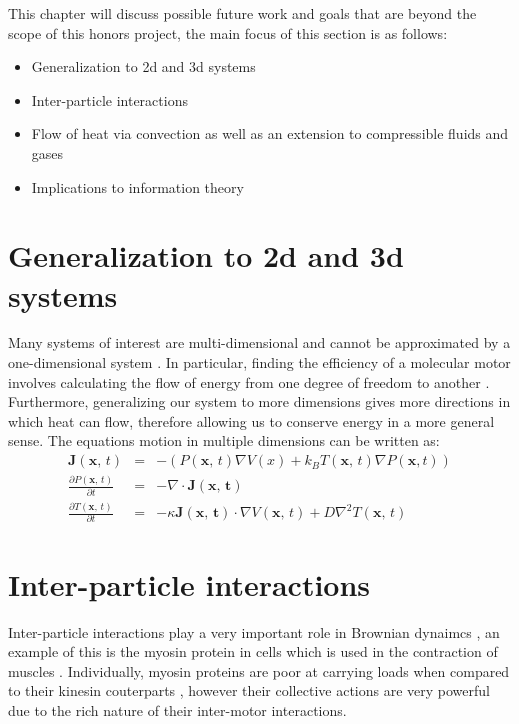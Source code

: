 This chapter will discuss possible future work and goals that are beyond the scope of this honors project, the main focus of this section is as follows:

\begin{itemize}
    \item{Generalization to 2d and 3d systems}
    \item{Inter-particle interactions}
    \item{Flow of heat via convection as well as an extension to compressible fluids and gases}
    \item{Implications to information theory}
\end{itemize}

\section{Generalization to 2d and 3d systems}
Many systems of interest are multi-dimensional and cannot be approximated by a one-dimensional system \cite{KellerBustamante2000,Magnasco1994,Reimann2001,ChallisJack2014,M.W.Jack2016}. In particular, finding the efficiency of a molecular motor involves calculating the flow of energy from one degree of freedom to another \cite{M.W.Jack2016}. Furthermore, generalizing our system to more dimensions gives more directions in which heat can flow, therefore allowing us to conserve energy in a more general sense. The equations motion in multiple dimensions can be written as:
\begin{eqnarray}
\mathbf{J}(\mathbf{x}, \, t) &=& - (P(\mathbf{x}, \, t) \nabla V(x) + k_B T(\mathbf{x}, \, t) \nabla P(\mathbf{x}, t)) \\
\frac{\partial P(\mathbf{x}, \, t)}{\partial t} &=& -\nabla \cdot \mathbf{J(\mathbf{x}, \, t)} \\
\frac{\partial T(\mathbf{x}, \, t)}{\partial t} &=& -\kappa \mathbf{J(\mathbf{x}, \, t)} \cdot \nabla V(\mathbf{x}, \, t) + D \nabla^2 T(\mathbf{x}, \, t)
\end{eqnarray}

\section{Inter-particle interactions}
Inter-particle interactions play a very important role in Brownian dynaimcs \cite{leibler1990physical,Leibler1993}, an example of this is the myosin protein in cells which is used in the contraction of muscles \cite{TyskaWarshaw2002}. Individually, myosin proteins are poor at carrying loads when compared to their kinesin couterparts \cite{TyskaWarshaw2002}, however their collective actions are very powerful due to the rich nature of their inter-motor interactions.

